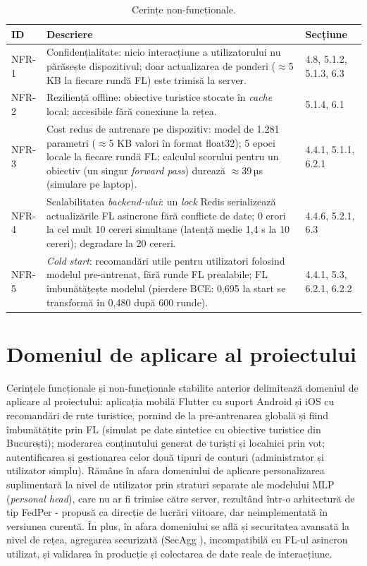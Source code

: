 \documentclass[12pt,a4paper]{report}
\begin{document}
\begin{table}[h]
\centering
\scriptsize
\caption{Cerințe non-funcționale.}
\label{tab:cerinte-nonfunctionale}
\begin{tabular}{|l|p{10cm}|p{2.5cm}|}
\hline
\textbf{ID} & \textbf{Descriere} & \textbf{Secțiune} \\
\hline
NFR-1 & Confidențialitate: nicio interacțiune a utilizatorului nu părăsește dispozitivul; doar actualizarea de ponderi ($\approx$5 KB la fiecare rundă FL) este trimisă la server. & 4.8, 5.1.2, 5.1.3, 6.3 \\
\hline
NFR-2 & Reziliență offline: obiective turistice stocate în \textit{cache} local; accesibile fără conexiune la rețea. & 5.1.4, 6.1 \\
\hline
NFR-3 & Cost redus de antrenare pe dispozitiv: model de 1.281 parametri ($\approx$5 KB valori în format float32); 5 epoci locale la fiecare rundă FL; calculul scorului pentru un obiectiv (un singur \textit{forward pass}) durează $\approx$39\,µs (simulare pe laptop). & 4.4.1, 5.1.1, 6.2.1 \\
\hline
NFR-4 & Scalabilitatea \textit{backend-ului}: un \textit{lock} Redis serializează actualizările FL asincrone fără conflicte de date; 0 erori la cel mult 10 cereri simultane (latență medie 1,4 s la 10 cereri); degradare la 20 cereri. & 4.4.6, 5.2.1, 6.3 \\
\hline
NFR-5 & \textit{Cold start}: recomandări utile pentru utilizatori folosind modelul pre-antrenat, fără runde FL prealabile; FL îmbunătățește modelul (pierdere BCE: 0,695 la start se transformă în 0,480 după 600 runde). & 4.4.1, 5.3, 6.2.1, 6.2.2 \\
\hline
\end{tabular}
\end{table}

\section{Domeniul de aplicare al proiectului}

Cerințele funcționale și non-funcționale stabilite anterior delimitează domeniul de aplicare al proiectului: aplicația mobilă Flutter cu suport Android și iOS cu recomandări de rute turistice, pornind de la pre-antrenarea globală și fiind îmbunătățite prin FL (simulat pe date sintetice cu obiective turistice din București); moderarea conținutului generat de turiști și localnici prin vot; autentificarea și gestionarea celor două tipuri de conturi (administrator și utilizator simplu). Rămâne în afara domeniului de aplicare personalizarea suplimentară la nivel de utilizator prin straturi separate ale modelului MLP (\textit{personal head}), care nu ar fi trimise către server, rezultând într-o arhitectură de tip FedPer \cite{arivazhagan2019fedper} - propusă ca direcție de lucrări viitoare, dar neimplementată în versiunea curentă. În plus, în afara domeniului se află și securitatea avansată la nivel de rețea, agregarea securizată (SecAgg \cite{bonawitz2017secagg}), incompatibilă cu FL-ul asincron utilizat, și validarea în producție și colectarea de date reale de interacțiune.
\end{document}
